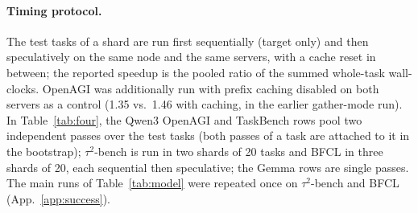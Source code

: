 \paragraph{Timing protocol.}
The test tasks of a shard are run first sequentially (target only) and then speculatively
on the same node and the same servers, with a cache reset in between; the
reported speedup is the pooled ratio of the summed whole-task wall-clocks.
OpenAGI was additionally run with prefix caching disabled on both servers as a
control (1.35\xx{} vs.\ 1.46\xx{} with caching, in the earlier gather-mode run). In Table~\ref{tab:four}, the
Qwen3 OpenAGI and TaskBench rows pool two independent passes over the test tasks (both passes of a task are
attached to it in the bootstrap); $\tau^2$-bench is run in two shards of 20 tasks and BFCL in three shards of
20, each sequential then speculative; the Gemma rows are single passes. The main runs of Table~\ref{tab:model}
were repeated once on $\tau^2$-bench and BFCL (App.~\ref{app:success}).


